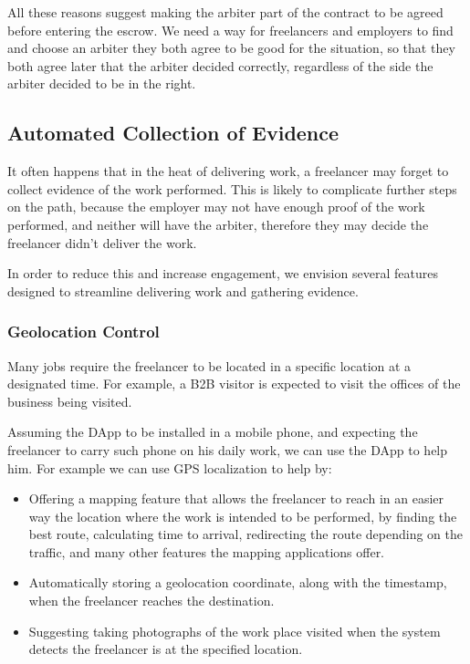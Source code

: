 \documentclass{article}
\begin{document}
All these reasons suggest making the arbiter part of the contract to be agreed before entering the escrow. We need a way for freelancers and employers to find and choose an arbiter they both agree to be good for the situation, so that they both agree later that the arbiter decided correctly, regardless of the side the arbiter decided to be in the right.

\subsection{Automated Collection of Evidence}

It often happens that in the heat of delivering work, a freelancer may forget to collect evidence of the work performed. This is likely to complicate further steps on the path, because the employer may not have enough proof of the work performed, and neither will have the arbiter, therefore they may decide the freelancer didn't deliver the work.

In order to reduce this and increase engagement, we envision several features designed to streamline delivering work and gathering evidence.

\subsubsection{Geolocation Control}

Many jobs require the freelancer to be located in a specific location at a designated time. For example, a B2B visitor is expected to visit the offices of the business being visited.

Assuming the DApp to be installed in a mobile phone, and expecting the freelancer to carry such phone on his daily work, we can use the DApp to help him. For example we can use GPS localization to help by:

\begin{itemize}
  \item Offering a mapping feature that allows the freelancer to reach in an easier way the location where the work is intended to be performed, by finding the best route, calculating time to arrival, redirecting the route depending on the traffic, and many other features the mapping applications offer.
  \item Automatically storing a geolocation coordinate, along with the timestamp, when the freelancer reaches the destination.
  \item Suggesting taking photographs of the work place visited when the system detects the freelancer is at the specified location.
\end{itemize}
\end{document}
